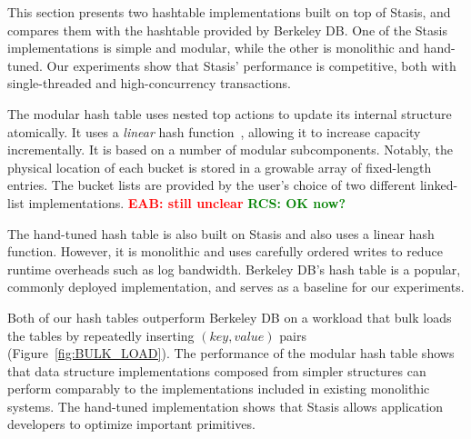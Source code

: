 \documentclass[letterpaper,twocolumn,10pt]{article}
\newcommand{\yad}{Stasis\xspace}
\newcommand{\yads}{Stasis'\xspace}
\newcommand{\eab}[1]{\textcolor{red}{\bf EAB: #1}}
\newcommand{\rcs}[1]{\textcolor{green}{\bf RCS: #1}}
\begin{document}
This section presents two hashtable implementations built on top of
\yad, and compares them with the hashtable provided by Berkeley DB.
One of the \yad implementations is simple and modular, while
the other is monolithic and hand-tuned.  Our experiments show that
\yads performance is competitive, both with single-threaded and
high-concurrency transactions.


The modular hash table uses nested top actions to update its internal
structure atomically.  It uses a {\em linear} hash
function~\cite{lht}, allowing it to increase capacity incrementally.
It is based on a number of modular subcomponents.  Notably, the
physical location of each bucket is stored in a growable array of
fixed-length entries.  The bucket lists are provided by the user's
choice of two different linked-list implementations. \eab{still
unclear} \rcs{OK now?}

The hand-tuned hash table is also built on \yad and also uses a linear hash
function.  However, it is monolithic and uses carefully ordered writes to
reduce runtime overheads such as log bandwidth.  Berkeley DB's
hash table is a popular, commonly deployed implementation, and serves
as a baseline for our experiments.

Both of our hash tables outperform Berkeley DB on a workload that bulk
loads the tables by repeatedly inserting $(key, value)$ pairs
(Figure~\ref{fig:BULK_LOAD}).
The performance of the modular hash table shows that
data structure implementations composed from
simpler structures can perform comparably to the implementations included 
in existing monolithic systems.  The hand-tuned
implementation shows that \yad allows application developers to
optimize important primitives.
\end{document}
